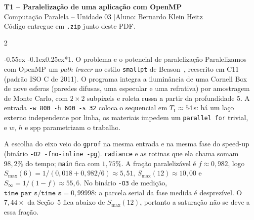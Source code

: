 \documentclass[10pt,a4paper]{article}
\makeatletter
\renewcommand\section{\@startsection{section}{1}{\z@}%
  {-0.55ex \@plus -0.1ex}{0.25ex}{\normalfont\normalsize\bfseries}}
\makeatother
\begin{document}
\begin{center}
  {\large\bfseries T1 -- Paraleliza\c{c}\~ao de uma aplica\c{c}\~ao com OpenMP}\\[1pt]
  {\small Computa\c{c}\~ao Paralela -- Unidade 03 \quad|\quad Aluno: Bernardo Klein Heitz}\\[0.5pt]
  {\footnotesize C\'odigo entregue em \texttt{.zip} junto deste PDF.}
\end{center}

\vspace{-6pt}
\begin{multicols}{2}
\raggedcolumns

\section*{1. O problema e o potencial de paraleliza\c{c}\~ao}
Paralelizamos com OpenMP um \emph{path tracer} no estilo \texttt{smallpt} de
Beason~\cite{beason2008}, reescrito em C11 (padr\~ao ISO C de 2011). O programa
integra a ilumin\^ancia de uma Cornell Box de nove esferas (paredes difusas,
uma especular e uma refrativa) por amostragem de Monte Carlo, com $2\times 2$
subpixels e roleta russa a partir da profundidade 5. A entrada
\texttt{-w 800 -h 600 -s 32} coloca o sequencial em $T_1\approx 54$\,s: h\'a um
la\c{c}o externo independente por linha, os materiais impedem um
\texttt{parallel for} trivial, e $w$, $h$ e $\mathrm{spp}$ parametrizam o
trabalho.

A escolha do eixo veio do \texttt{gprof} na mesma entrada e na mesma fase do
speed-up (bin\'ario \texttt{-O2 -fno-inline -pg}). \texttt{radiance} e as
rotinas que ela chama somam $98{,}2\%$ do tempo; \texttt{main} fica com
$1{,}75\%$. A fra\c{c}\~ao paraleliz\'avel \'e $f\approx 0{,}982$, logo
$S_{\max}(6)=1/(0{,}018+0{,}982/6)\approx 5{,}51$,
$S_{\max}(12)\approx 10{,}00$ e $S_{\infty}=1/(1-f)\approx 55{,}6$. No bin\'ario
\texttt{-O3} de medi\c{c}\~ao, $\mathtt{time\_par\_s}/\mathtt{time\_s}=0{,}99998$:
a parcela serial da fase medida \'e desprez\'ivel. O $7{,}44\times$ da
Se\c{c}\~ao~5 fica abaixo de $S_{\max}(12)$, portanto a satura\c{c}\~ao n\~ao se
deve a essa fra\c{c}\~ao.


\end{multicols}
\end{document}
